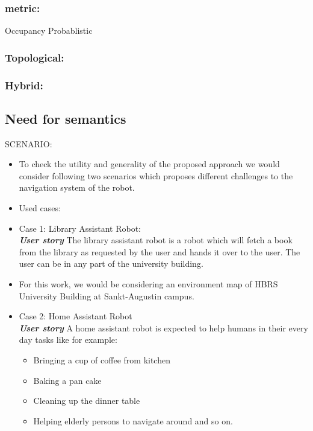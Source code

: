 \subsubsection{metric:}
    Occupancy
    Probablistic
\subsubsection{Topological:}
\subsubsection{Hybrid:}  
\subsection{Need for semantics}




SCENARIO:

\begin{itemize}[noitemsep,nolistsep]
 \item To check the utility and generality of the proposed approach we would consider following two scenarios which proposes different challenges to the navigation system of the robot.
 \item Used cases:
 \item Case 1: Library Assistant Robot:\\
 \textbf{\textit{User story}} The library assistant robot is a robot which will fetch a book from the library as requested by the user and hands it over to the user.
 The user can be in any part of the university building.
 \item For this work, we would be considering an environment map of HBRS University Building at Sankt-Augustin campus.\\

 \item Case 2: Home Assistant Robot\\
 \textbf{\textit{User story}} A home assistant robot is expected to help humans in their every day tasks like for example:
 \begin{itemize}[noitemsep,nolistsep]
   \item Bringing a cup of coffee from kitchen
   \item Baking a pan cake
   \item Cleaning up the dinner table 
   \item Helping elderly persons to navigate around and so on.
 \end{itemize}   
\end{itemize}


